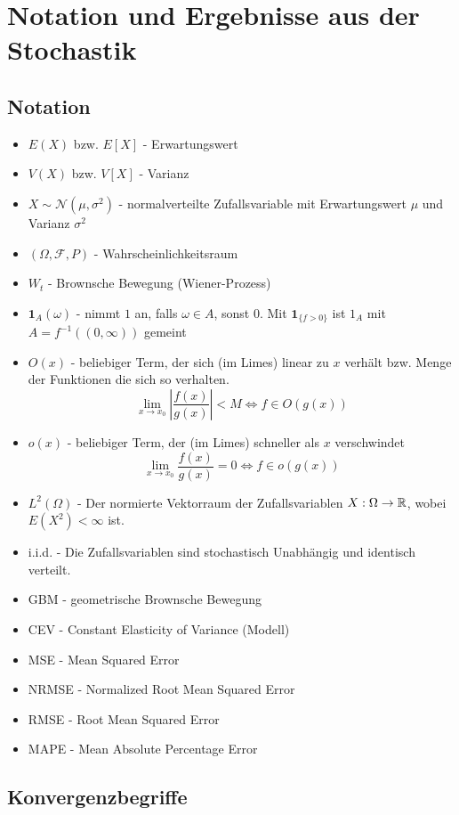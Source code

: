 \section{Notation und Ergebnisse aus der Stochastik}
\subsection{Notation}
\begin{itemize}
    \item $E(X)$ bzw. $E[X]$ - Erwartungswert
    \item $V(X)$ bzw. $V[X]$ - Varianz
    \item $X \sim \mathcal N(\mu, \sigma^2)$ - normalverteilte Zufallsvariable mit Erwartungswert $\mu$ und Varianz $\sigma^2$
    \item $(\Omega, \mathcal F, P)$ - Wahrscheinlichkeitsraum
    \item $W_t$ - Brownsche Bewegung (Wiener-Prozess)
    \item $\mathbf 1_A(\omega)$ - nimmt $1$ an, falls $\omega \in A$, sonst $0$. Mit $\mathbf 1_{\{f \gt 0\}}$ ist $1_A$ mit $A=f^{-1}((0, \infty))$ gemeint
    \item $O(x)$ - beliebiger Term, der sich (im Limes) linear zu $x$ verhält bzw. Menge der Funktionen die sich so verhalten.
$$\lim_{x \to x_0} \left \vert \frac{f(x)}{g(x)} \right \vert  \lt M \iff f \in O(g(x))$$    
    \item $o(x)$ - beliebiger Term, der (im Limes) schneller als $x$ verschwindet
$$\lim_{x \to x_0} \frac{f(x)}{g(x)} = 0 \iff f \in o(g(x))$$    
    \item $L^2(\Omega)$ - Der normierte Vektorraum der Zufallsvariablen $X : \Omega \to \Bbb R$, wobei $E(X^2) \lt \infty$ ist.
    \item i.i.d. - Die Zufallsvariablen sind stochastisch Unabhängig und identisch verteilt.
    \item GBM - geometrische Brownsche Bewegung
    \item CEV - Constant Elasticity of Variance (Modell)
    \item MSE - Mean Squared Error
    \item NRMSE - Normalized Root Mean Squared Error
    \item RMSE - Root Mean Squared Error
    \item MAPE - Mean Absolute Percentage Error
\end{itemize}

\subsection{Konvergenzbegriffe}

